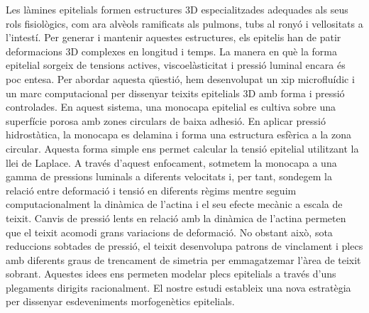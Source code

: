 \begin{Abstractcat}
	
	Les làmines epitelials formen estructures 3D especialitzades adequades als seus rols fisiològics, com ara alvèols ramificats als pulmons, tubs al ronyó i vellositats a l'intestí. Per generar i mantenir aquestes estructures, els epitelis han de patir deformacions 3D complexes en longitud i temps. La manera en què la forma epitelial sorgeix de tensions actives, viscoelàsticitat i pressió luminal encara és poc entesa. Per abordar aquesta qüestió, hem desenvolupat un xip microfluídic i un marc computacional per dissenyar teixits epitelials 3D amb forma i pressió controlades. En aquest sistema, una monocapa epitelial es cultiva sobre una superfície porosa amb zones circulars de baixa adhesió. En aplicar pressió hidrostàtica, la monocapa es delamina i forma una estructura esfèrica a la zona circular. Aquesta forma simple ens permet calcular la tensió epitelial utilitzant la llei de Laplace. A través d'aquest enfocament, sotmetem la monocapa a una gamma de pressions luminals a diferents velocitats i, per tant, sondegem la relació entre deformació i tensió en diferents règims mentre seguim computacionalment la dinàmica de l'actina i el seu efecte mecànic a escala de teixit. Canvis de pressió lents en relació amb la dinàmica de l'actina permeten que el teixit acomodi grans variacions de deformació. No obstant això, sota reduccions sobtades de pressió, el teixit desenvolupa patrons de vinclament i plecs amb diferents graus de trencament de simetria per emmagatzemar l'àrea de teixit sobrant. Aquestes idees ens permeten modelar plecs epitelials a través d'uns plegaments dirigits racionalment. El nostre estudi estableix una nova estratègia per dissenyar esdeveniments morfogenètics epitelials.
	
\end{Abstractcat}

\cleardoublepage